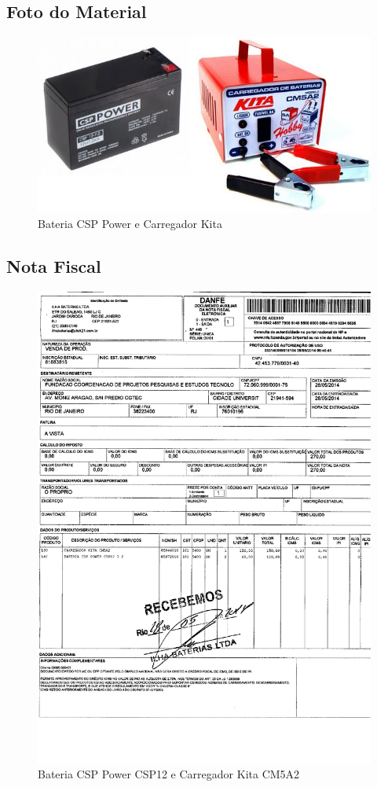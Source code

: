 \subsection{Foto do Material}
\begin{figure}[H]
 \centering
 \includegraphics[width=1\columnwidth]{Bateria/foto.png}
 \caption{Bateria CSP Power e Carregador Kita}
\end{figure}

\subsection{Nota Fiscal}
\begin{figure}[H]
 \centering
 \includegraphics[width=1\columnwidth]{Bateria/nota_bateria.pdf}
 \caption{Bateria CSP Power CSP12 e Carregador Kita CM5A2 } 
 \end{figure}


